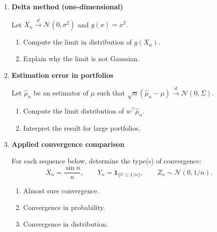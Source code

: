 \documentclass[11pt]{article}
\begin{document}
\begin{enumerate}
\item \textbf{Delta method (one-dimensional)}

Let $X_n\xrightarrow{d}\mathcal{N}(0,\sigma^2)$ and $g(x)=x^2$.

\begin{enumerate}
\item Compute the limit in distribution of $g(X_n)$.
\item Explain why the limit is not Gaussian.
\end{enumerate}

\bigskip

\item \textbf{Estimation error in portfolios}

Let $\hat\mu_n$ be an estimator of $\mu$ such that
$\sqrt{n}(\hat\mu_n-\mu)\xrightarrow{d}\mathcal{N}(0,\Sigma)$.

\begin{enumerate}
\item Compute the limit distribution of $w^\top\hat\mu_n$.
\item Interpret the result for large portfolios.
\end{enumerate}

\bigskip

\item \textbf{Applied convergence comparison}

For each sequence below, determine the type(s) of convergence:
\[
X_n=\frac{\sin n}{n},\qquad
Y_n=\mathbf{1}_{\{U\le 1/n\}},\qquad
Z_n\sim \mathcal{N}(0,1/n).
\]

\begin{enumerate}
\item Almost sure convergence.
\item Convergence in probability.
\item Convergence in distribution.
\end{enumerate}

\end{enumerate}
\end{document}
